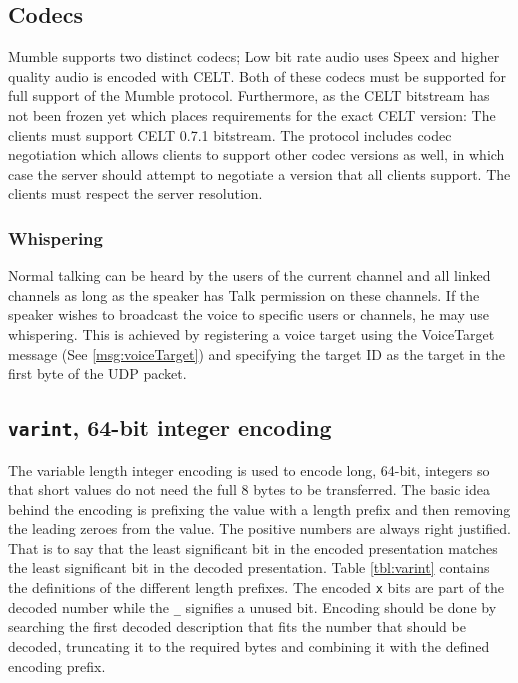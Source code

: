 \documentclass[11pt]{article} %
\begin{document}
\subsection{Codecs}
\label{sect:codecs}

Mumble supports two distinct codecs; Low bit rate audio uses Speex and higher quality audio is encoded with CELT. Both of these codecs must be supported for full support of the Mumble protocol. Furthermore, as the CELT bitstream has not been frozen yet which places requirements for the exact CELT version: The clients must support CELT 0.7.1 bitstream. The protocol includes codec negotiation which allows clients to support other codec versions as well, in which case the server should attempt to negotiate a version that all clients support. The clients must respect the server resolution.

\subsubsection{Whispering}
\label{sect:whispering}

Normal talking can be heard by the users of the current channel and all linked channels as long as the speaker has Talk permission on these channels. If the speaker wishes to broadcast the voice to specific users or channels, he may use whispering. This is achieved by registering a voice target using the VoiceTarget message (See \ref{msg:voiceTarget}) and specifying the target ID as the target in the first byte of the UDP packet.

\subsection {\texttt{varint}, 64-bit integer encoding}
\label{sect:varint}

The variable length integer encoding is used to encode long, 64-bit, integers so that short values do not need the full 8 bytes to be transferred. The basic idea behind the encoding is prefixing the value with a length prefix and then removing the leading zeroes from the value. The positive numbers are always right justified. That is to say that the least significant bit in the encoded presentation matches the least significant bit in the decoded presentation. Table \ref{tbl:varint} contains the definitions of the different length prefixes. The encoded \texttt{x} bits are part of the decoded number while the \texttt{\_} signifies a unused bit. Encoding should be done by searching the first decoded description that fits the number that should be decoded, truncating it to the required bytes and combining it with the defined encoding prefix. 
\end{document}
